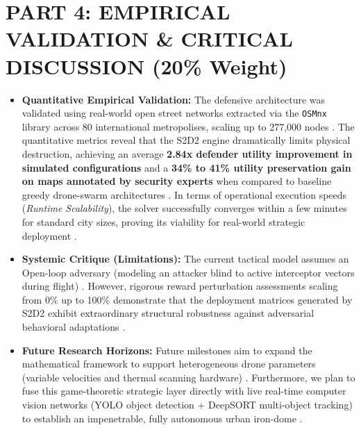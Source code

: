 \documentclass[../main.tex]{subfiles}
\begin{document}

\section{PART 4: EMPIRICAL VALIDATION \& CRITICAL DISCUSSION (20\% Weight)}

\begin{itemize}
    \item \textbf{Quantitative Empirical Validation:} The defensive architecture was validated using real-world open street networks extracted via the \texttt{OSMnx} library \cite{boeing2017osmnx} across 80 international metropolises, scaling up to 277,000 nodes \cite{mutzari2025defending}. The quantitative metrics reveal that the S2D2 engine dramatically limits physical destruction, achieving an average \textbf{2.84x defender utility improvement in simulated configurations} and a \textbf{34\% to 41\% utility preservation gain on maps annotated by security experts} when compared to baseline greedy drone-swarm architectures \cite{mutzari2025defending}. In terms of operational execution speeds (\textit{Runtime Scalability}), the solver successfully converges within a few minutes for standard city sizes, proving its viability for real-world strategic deployment \cite{mutzari2025defending}.
    \item \textbf{Systemic Critique (Limitations):} The current tactical model assumes an Open-loop adversary (modeling an attacker blind to active interceptor vectors during flight) \cite{mutzari2025defending}. However, rigorous reward perturbation assessments scaling from 0\% up to 100\% demonstrate that the deployment matrices generated by S2D2 exhibit extraordinary structural robustness against adversarial behavioral adaptations \cite{mutzari2025defending}.
    \item \textbf{Future Research Horizons:} Future milestones aim to expand the mathematical framework to support heterogeneous drone parameters (variable velocities and thermal scanning hardware) \cite{mutzari2025defending}. Furthermore, we plan to fuse this game-theoretic strategic layer directly with live real-time computer vision networks (YOLO object detection + DeepSORT multi-object tracking) to establish an impenetrable, fully autonomous urban iron-dome \cite{mutzari2025defending}.
\end{itemize}
\end{document}
